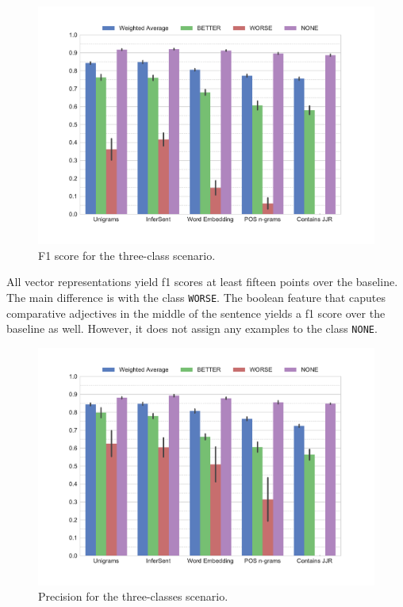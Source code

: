 \begin{figure}[ht]
      \caption{F1 score for the three-class scenario.} 
    \label{fig:3_f1}
 \centering
	\includegraphics[width=1\textwidth]{images/experiments/f1-False}

\end{figure}

All vector representations yield f1 scores at least fifteen points over the baseline. The main difference is with the class \texttt{WORSE}. The boolean feature that caputes comparative adjectives in the middle of the sentence yields a f1 score over the baseline as well. However, it does not assign any examples to the class \texttt{NONE}.

\begin{figure}[ht]
   \caption{Precision for the three-classes scenario.} 
    \label{fig:3_precision}
 \centering
	\includegraphics[width=1\textwidth]{images/experiments/precision-False}
\end{figure}

